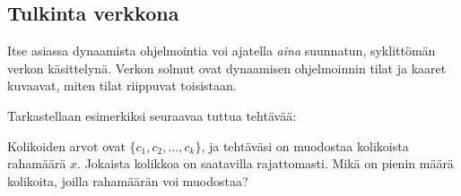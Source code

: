 \subsection{Tulkinta verkkona}

Itse asiassa dynaamista ohjelmointia voi
ajatella \textit{aina} suunnatun,
syklittömän verkon käsittelynä.
Verkon solmut ovat dynaamisen ohjelmoinnin
tilat ja kaaret kuvaavat, miten tilat
riippuvat toisistaan.

Tarkastellaan esimerkiksi seuraavaa
tuttua tehtävää:

\begin{task}
Kolikoiden arvot ovat $\{c_1,c_2,\ldots,c_k\}$,
ja tehtäväsi on muodostaa kolikoista rahamäärä $x$.
Jokaista kolikkoa on saatavilla rajattomasti.
Mikä on pienin määrä kolikoita,
joilla rahamäärän voi muodostaa?
\end{task}

